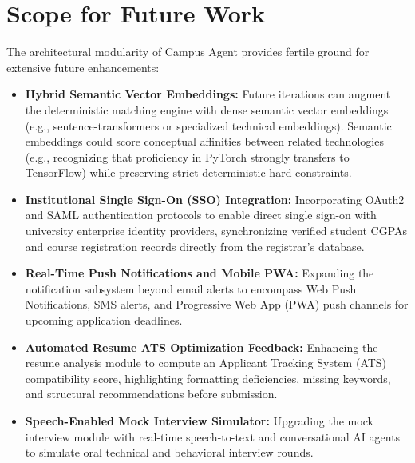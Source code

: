 \section{Scope for Future Work} \label{S7.4}
The architectural modularity of Campus Agent provides fertile ground for extensive future enhancements:
\begin{itemize}
	\item \textbf{Hybrid Semantic Vector Embeddings:} Future iterations can augment the deterministic matching engine with dense semantic vector embeddings (e.g., sentence-transformers or specialized technical embeddings). Semantic embeddings could score conceptual affinities between related technologies (e.g., recognizing that proficiency in PyTorch strongly transfers to TensorFlow) while preserving strict deterministic hard constraints.
	\item \textbf{Institutional Single Sign-On (SSO) Integration:} Incorporating OAuth2 and SAML authentication protocols to enable direct single sign-on with university enterprise identity providers, synchronizing verified student CGPAs and course registration records directly from the registrar's database.
	\item \textbf{Real-Time Push Notifications and Mobile PWA:} Expanding the notification subsystem beyond email alerts to encompass Web Push Notifications, SMS alerts, and Progressive Web App (PWA) push channels for upcoming application deadlines.
	\item \textbf{Automated Resume ATS Optimization Feedback:} Enhancing the resume analysis module to compute an Applicant Tracking System (ATS) compatibility score, highlighting formatting deficiencies, missing keywords, and structural recommendations before submission.
	\item \textbf{Speech-Enabled Mock Interview Simulator:} Upgrading the mock interview module with real-time speech-to-text and conversational AI agents to simulate oral technical and behavioral interview rounds.
\end{itemize}
